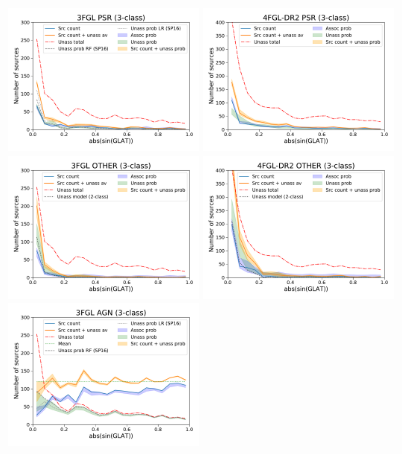 \documentclass[referee]{aa} %
\begin{document}
\begin{figure}[h]
\centering
\includegraphics[width=0.45\textwidth]{plots/lat_profile_PSR_3FGL_3classes.pdf}
\includegraphics[width=0.45\textwidth]{plots/lat_profile_PSR_4FGL-DR2_3classes.pdf} \\
\includegraphics[width=0.45\textwidth]{plots/lat_profile_OTHER_3FGL_3classes.pdf}
\includegraphics[width=0.45\textwidth]{plots/lat_profile_OTHER_4FGL-DR2_3classes.pdf} \\ 
\includegraphics[width=0.45\textwidth]{plots/lat_profile_AGN_3FGL_3classes.pdf}

\end{figure}
\end{document}
